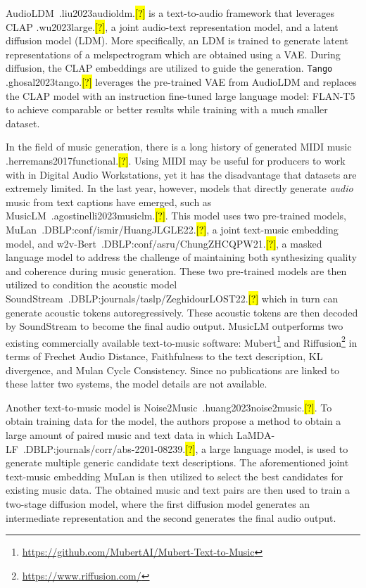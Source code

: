 \documentclass[11pt]{article}
\let\realcite\cite
\renewcommand{\cite}[1]{\ifx.#1.\hl{[?]}\else\realcite{#1}\fi}
\begin{document}
AudioLDM~\cite{liu2023audioldm} is a text-to-audio framework that leverages CLAP \cite{wu2023large}, a joint audio-text representation model, and a latent diffusion model (LDM). More specifically, an LDM is trained to generate latent representations of a melspectrogram which are obtained using a VAE. During diffusion, the CLAP embeddings are utilized to guide the generation. \texttt{Tango} \cite{ghosal2023tango} leverages the pre-trained VAE from AudioLDM and replaces the CLAP model with an instruction fine-tuned large language model: FLAN-T5 to achieve comparable or better results while training with a much smaller dataset.








In the field of music generation, there is a long history of generated MIDI music \cite{herremans2017functional}. Using MIDI may be useful for producers to work with in Digital Audio Workstations, yet it has the disadvantage that datasets are extremely limited. In the last year, however, models that directly generate \textit{audio} music from text captions have emerged, such as MusicLM~\cite{agostinelli2023musiclm}. This model uses two pre-trained models, MuLan~\cite{DBLP:conf/ismir/HuangJLGLE22}, a joint text-music embedding model, and w2v-Bert~\cite{DBLP:conf/asru/ChungZHCQPW21}, a masked language model to address the challenge of maintaining both synthesizing quality and coherence during music generation. These two pre-trained models are then utilized to condition the acoustic model SoundStream~\cite{DBLP:journals/taslp/ZeghidourLOST22} which in turn can generate acoustic tokens autoregressively. These acoustic tokens are then decoded by SoundStream to become the final audio output. MusicLM outperforms two existing commercially available text-to-music software: Mubert\footnote{\url{https://github.com/MubertAI/Mubert-Text-to-Music}} and Riffusion\footnote{\url{https://www.riffusion.com/}} in terms of Frechet Audio Distance, Faithfulness to the text description, KL divergence, and Mulan Cycle Consistency. Since no publications are linked to these latter two systems, the model details are not available. 




Another text-to-music model is Noise2Music~\cite{huang2023noise2music}. To obtain training data for the model, the authors propose a method to obtain a large amount of paired music and text data in which LaMDA-LF~\cite{DBLP:journals/corr/abs-2201-08239}, a large language model, is used to generate multiple generic candidate text descriptions. The aforementioned joint text-music embedding MuLan is then utilized to select the best candidates for existing music data. The obtained music and text pairs are then used to train a two-stage diffusion model, where the first diffusion model generates an intermediate representation and the second generates the final audio output. 
\end{document}
